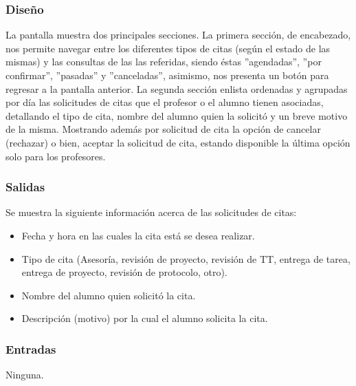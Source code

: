 \subsubsection{Diseño}
	\noindent
	La pantalla muestra dos principales secciones. La primera sección, de encabezado, nos permite navegar entre los diferentes tipos de citas (según el estado de las mismas) y las consultas de las las referidas, siendo éstas ''agendadas'', ''por confirmar'', ''pasadas'' y ''canceladas'', asimismo, nos presenta un botón para regresar a la pantalla anterior.
	\newline
	La segunda sección enlista ordenadas y agrupadas por día las solicitudes de citas que el profesor o el alumno tienen asociadas, detallando el tipo de cita, nombre del alumno quien la solicitó y un breve motivo de la misma. Mostrando además por solicitud de cita la opción de cancelar (rechazar) o bien, aceptar la solicitud de cita, estando disponible la última opción solo para los profesores. 

\pagebreak
{}

\subsubsection{Salidas}
	\noindent
	Se muestra la siguiente información acerca de las solicitudes de citas:
		\begin{itemize}
			\item Fecha y hora en las cuales la cita está se desea realizar.
			\item Tipo de cita (Asesoría, revisión de proyecto, revisión de TT, entrega de tarea, entrega de proyecto, revisión de protocolo, otro).
			\item Nombre del alumno quien solicitó la cita.
			\item Descripción (motivo) por la cual el alumno solicita la cita.
		\end{itemize}

\subsubsection{Entradas}
	\noindent
	Ninguna.

